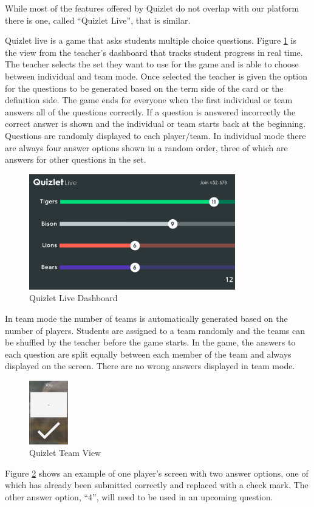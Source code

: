 \documentclass{article}
\begin{document}
While most of the features offered by Quizlet do not overlap with our platform there is one, called ``Quizlet Live'', that is similar.
\smallskip

Quizlet live is a game that asks students multiple choice questions. Figure \ref{fig:quizlet-live} is the view from the teacher's dashboard that tracks student progress in real time. The teacher selects the set they want to use for the game and is able to choose between individual and team mode. Once selected the teacher is given the option for the questions to be generated based on the term side of the card or the definition side. The game ends for everyone when the first individual or team answers all of the questions correctly. If a question is answered incorrectly the correct answer is shown and the individual or team starts back at the beginning. Questions are randomly displayed to each player/team. In individual mode there are always four answer options shown in a random order, three of which are answers for other questions in the set.

\begin{figure}
    \centering
    \includegraphics[width=0.8\textwidth]{images/quizlet-live.png}
    \caption{Quizlet Live Dashboard \cite{quizlet}}
    \label{fig:quizlet-live}
\end{figure}

In team mode the number of teams is automatically generated based on the number of players. Students are assigned to a team randomly and the teams can be shuffled by the teacher before the game starts. In the game, the answers to each question are split equally between each member of the team and always displayed on the screen. There are no wrong answers displayed in team mode.
\begin{figure}
    \centering
    \includegraphics[width=0.15\textwidth]{images/quizlet-team.png}
    \caption{Quizlet Team View \cite{quizlet}}
    \label{fig:quizlet-team}
\end{figure}
Figure \ref{fig:quizlet-team} shows an example of one player's screen with two answer options, one of which has already been submitted correctly and replaced with a check mark. The other answer option, ``4'', will need to be used in an upcoming question.
\smallskip
\end{document}
